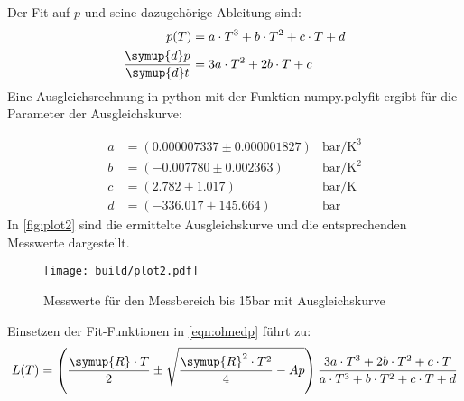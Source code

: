     Der Fit auf $p$ und seine dazugehörige Ableitung sind: 
    \begin{align*}
        p(T)&=a\cdot T^3+b\cdot T^2 + c\cdot T+d \\
        \frac{\symup{d}p}{\symup{d}t}&=3a\cdot T^2+2b\cdot T + c 
    \end{align*}
    Eine Ausgleichsrechnung in python mit der Funktion numpy.polyfit ergibt für die Parameter der Ausgleichskurve:
  
    \begin{align}
      a	&= (0.000007337 \pm 0.000001827) & \si{\bar\per\cubic\kelvin}\\
      b	&= (-0.007780 \pm 0.002363) & \si{\bar\per\kelvin\squared}\\
    c	&=(2.782  \pm 1.017 )&  \si{\bar\per\kelvin}\\
    d	&=(-336.017  \pm 145.664) & \si{\bar}
  \end{align}
  In \autoref{fig:plot2} sind die ermittelte Ausgleichskurve und die entsprechenden Messwerte dargestellt.
    \begin{figure}[H]
      \centering
      \texttt{[image: build/plot2.pdf]}
      \caption{Messwerte für den Messbereich bis 15\si[]{\bar} mit Ausgleichskurve}
      \label{fig:plot2}
    \end{figure}
    \noindent
    Einsetzen der Fit-Funktionen in \autoref{eqn:ohnedp} führt zu:
    \begin{equation}
        L(T)=\left( \frac{\symup{R} \cdot T}{2} \pm\sqrt{\frac{\symup{R}^2\cdot T^2}{4}-Ap} \right)\frac{3a\cdot T^3+2b\cdot T^2 + c\cdot T}{a\cdot T^3+b\cdot T^2 + c\cdot T+d}
        \label{eqn:mitdp}
    \end{equation}